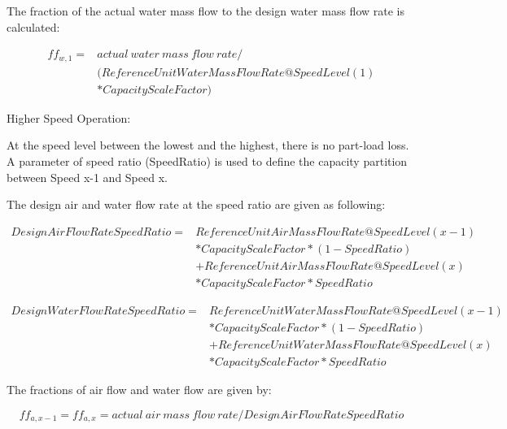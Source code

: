 The fraction of the actual water mass flow to the design water mass flow rate is calculated:

\begin{equation}
\begin{array}{rl}
  ff_{w,1} =& actual~water~mass~flow~rate/ \\
  &(ReferenceUnitWaterMassFlowRate@SpeedLevel(1) \\
  &*CapacityScaleFactor)
\end{array}
\end{equation}

Higher Speed Operation:

At the speed level between the lowest and the highest, there is no part-load loss. A parameter of speed ratio (SpeedRatio) is used to define the capacity partition between Speed x-1 and Speed x.

The design air and water flow rate at the speed ratio are given as following:

\begin{equation}
  \begin{array}{rl}
  DesignAirFlowRateSpeedRatio =& ReferenceUnitAirMassFlowRate@SpeedLevel\left( {x - 1} \right) \\
                              &* CapacityScaleFactor * \left(1-SpeedRatio\right) \\
                              &+ ReferenceUnitAirMassFlowRate@SpeedLevel\left( x \right) \\
                              &* CapacityScaleFactor * SpeedRatio
  \end{array}
\end{equation}

\begin{equation}
  \begin{array}{rl}
    DesignWaterFlowRateSpeedRatio =& ReferenceUnitWaterMassFlowRate@SpeedLevel\left( {x - 1} \right) \\
                                  &* CapacityScaleFactor * \left(1-SpeedRatio\right) \\
                                  &+ ReferenceUnitWaterMassFlowRate@SpeedLevel\left( x \right) \\
                                  &* CapacityScaleFactor * SpeedRatio
  \end{array}
\end{equation}

The fractions of air flow and water flow are given by:

\begin{equation}
ff_{a,x-1} = ff_{a,x} = actual~air~mass~flow~rate/DesignAirFlowRateSpeedRatio
\end{equation}

